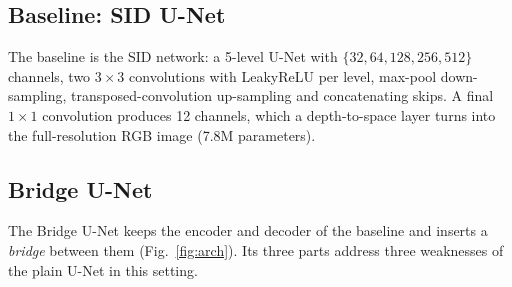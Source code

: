 \subsection{Baseline: SID U-Net}
The baseline is the SID network: a 5-level U-Net with $\{32,64,128,256,512\}$ channels, two $3\times3$ convolutions with LeakyReLU per level, max-pool down-sampling, transposed-convolution up-sampling and concatenating skips. A final $1\times1$ convolution produces 12 channels, which a depth-to-space layer turns into the full-resolution RGB image (7.8M parameters).

\subsection{Bridge U-Net}
\label{sec:bridge}
The Bridge U-Net keeps the encoder and decoder of the baseline and inserts a \emph{bridge} between them (Fig.~\ref{fig:arch}). Its three parts address three weaknesses of the plain U-Net in this setting.

